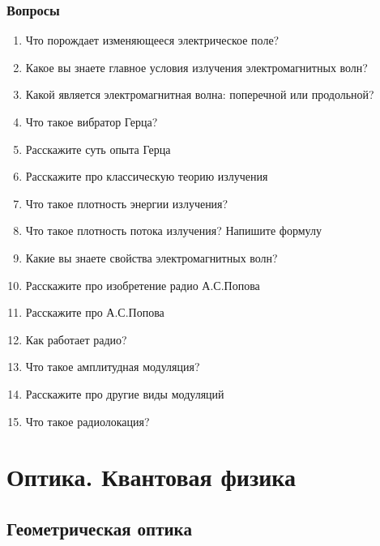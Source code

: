 \documentclass[12pt,a4paper]{report}
\begin{document}
\section{Вопросы}
\begin{enumerate}
\item Что порождает изменяющееся электрическое поле?
\item Какое вы знаете главное условия излучения электромагнитных волн?
\item Какой является электромагнитная волна: поперечной или продольной?
\item Что такое вибратор Герца?
\item Расскажите суть опыта Герца
\item Расскажите про классическую теорию излучения
\item Что такое плотность энергии излучения?
\item Что такое плотность потока излучения? Напишите формулу
\item Какие вы знаете свойства электромагнитных волн?
\item Расскажите про изобретение радио А.С.Попова
\item Расскажите про А.С.Попова
\item Как работает радио?
\item Что такое амплитудная модуляция?
\item Расскажите про другие виды модуляций
\item Что такое радиолокация? 
\end{enumerate}

\part{Оптика. Квантовая физика}
\setcounter{chapter}{0}

\chapter{Геометрическая оптика}
\end{document}
